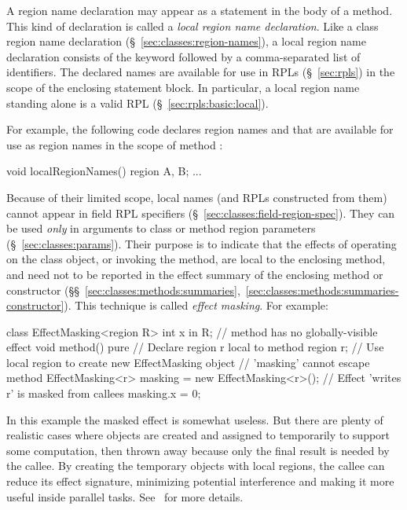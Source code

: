 A region name declaration may appear as a statement in the body of a
method.  This kind of declaration is called a \emph{local region name
  declaration}.  Like a class region name declaration
(\S~\ref{sec:classes:region-names}), a local region name declaration
consists of the keyword  followed by a comma-separated
list of identifiers.  The declared names are available for use in RPLs
(\S~\ref{sec:rpls}) in the scope of the enclosing statement block.  In
particular, a local region name standing alone is a valid RPL
(\S~\ref{sec:rpls:basic:local}).

For example, the following code declares
region names  and  that are available for use as region
names in the scope of method :
%
\begin{dpjlisting}
void localRegionNames() {
  region A, B;
  ...
}
\end{dpjlisting}
%

Because of their limited scope, local names (and RPLs constructed from
them) cannot appear in field RPL specifiers
(\S~\ref{sec:classes:field-region-spec}).  They can be used
\emph{only} in arguments to class or method region parameters
(\S~\ref{sec:classes:params}).  Their purpose is to indicate that the
effects of operating on the class object, or invoking the method, are
local to the enclosing method, and need not to be reported in the
effect summary of the enclosing method or constructor
(\S\S~\ref{sec:classes:methods:summaries},~\ref{sec:classes:methods:summaries-constructor}).
This technique is called \emph{effect masking}.  For example:
%
\begin{dpjlisting}
class EffectMasking<region R> {
  int x in R;
  // method has no globally-visible effect
  void method() 
    pure 
  {
    // Declare region r local to method
    region r;
    // Use local region to create new EffectMasking object
    // 'masking' cannot escape method
    EffectMasking<r> masking = new EffectMasking<r>();
    // Effect 'writes r' is masked from callees
    masking.x = 0;
  }
}
\end{dpjlisting}
%
In this example the masked effect is somewhat useless.  But there are
plenty of realistic cases where objects are created and assigned to
temporarily to support some computation, then thrown away because only
the final result is needed by the callee.  By creating the temporary
objects with local regions, the callee can reduce its effect
signature, minimizing potential interference and making it more useful
inside parallel tasks.  See \tutorial\ for more details.

